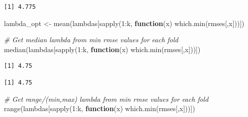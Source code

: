 \documentclass[
]{article}
\newenvironment{Shaded}{}{}
\newcommand{\CommentTok}[1]{\textcolor[rgb]{0.38,0.63,0.69}{\textit{#1}}}
\newcommand{\ControlFlowTok}[1]{\textcolor[rgb]{0.00,0.44,0.13}{\textbf{#1}}}
\newcommand{\DecValTok}[1]{\textcolor[rgb]{0.25,0.63,0.44}{#1}}
\newcommand{\FunctionTok}[1]{\textcolor[rgb]{0.02,0.16,0.49}{#1}}
\newcommand{\NormalTok}[1]{#1}
\newcommand{\OtherTok}[1]{\textcolor[rgb]{0.00,0.44,0.13}{#1}}
\newcommand{\SpecialCharTok}[1]{\textcolor[rgb]{0.25,0.44,0.63}{#1}}
\begin{document}
\begin{Shaded}
\end{Shaded}

\begin{verbatim}
[1] 4.775
\end{verbatim}

\begin{Shaded}
\begin{Highlighting}[]
\NormalTok{lambda\_opt }\OtherTok{\textless{}{-}} \FunctionTok{mean}\NormalTok{(lambdas[}\FunctionTok{sapply}\NormalTok{(}\DecValTok{1}\SpecialCharTok{:}\NormalTok{k, }\ControlFlowTok{function}\NormalTok{(x) }\FunctionTok{which.min}\NormalTok{(rmses[,x]))])}

\CommentTok{\# Get median lambda from min rmse values for each fold}
\FunctionTok{median}\NormalTok{(lambdas[}\FunctionTok{sapply}\NormalTok{(}\DecValTok{1}\SpecialCharTok{:}\NormalTok{k, }\ControlFlowTok{function}\NormalTok{(x) }\FunctionTok{which.min}\NormalTok{(rmses[,x]))])}
\end{Highlighting}
\end{Shaded}

\begin{verbatim}
[1] 4.75
\end{verbatim}

\begin{Shaded}
\end{Shaded}

\begin{verbatim}
[1] 4.75
\end{verbatim}

\begin{Shaded}
\begin{Highlighting}[]
\CommentTok{\# Get range/(min,max) lambda from min rmse values for each fold}
\FunctionTok{range}\NormalTok{(lambdas[}\FunctionTok{sapply}\NormalTok{(}\DecValTok{1}\SpecialCharTok{:}\NormalTok{k, }\ControlFlowTok{function}\NormalTok{(x) }\FunctionTok{which.min}\NormalTok{(rmses[,x]))])}
\end{Highlighting}
\end{Shaded}
\end{document}
